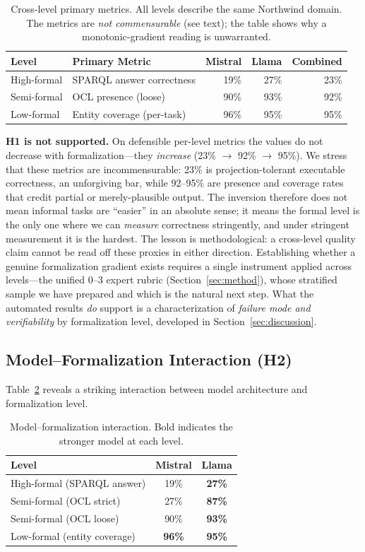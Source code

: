 \documentclass[runningheads]{llncs}
\begin{document}
\begin{table}[h]
\centering
\caption{Cross-level primary metrics. All levels describe the same Northwind domain. The metrics are \emph{not commensurable} (see text); the table shows why a monotonic-gradient reading is unwarranted.}
\label{tab:summary}
\begin{tabular}{llrrr}
\toprule
Level & Primary Metric & Mistral & Llama & Combined \\
\midrule
High-formal & SPARQL answer correctness & 19\% & 27\% & 23\% \\
Semi-formal & OCL presence (loose) & 90\% & 93\% & 92\% \\
Low-formal & Entity coverage (per-task) & 96\% & 95\% & 95\% \\
\bottomrule
\end{tabular}
\end{table}

\textbf{H1 is not supported.} On defensible per-level metrics the values do not decrease with formalization---they \emph{increase} (23\% $\to$ 92\% $\to$ 95\%). We stress that these metrics are incommensurable: 23\% is projection-tolerant executable correctness, an unforgiving bar, while 92--95\% are presence and coverage rates that credit partial or merely-plausible output. The inversion therefore does not mean informal tasks are ``easier'' in an absolute sense; it means the formal level is the only one where we can \emph{measure} correctness stringently, and under stringent measurement it is the hardest. The lesson is methodological: a cross-level quality claim cannot be read off these proxies in either direction. Establishing whether a genuine formalization gradient exists requires a single instrument applied across levels---the unified 0--3 expert rubric (Section~\ref{sec:method}), whose stratified sample we have prepared and which is the natural next step. What the automated results \emph{do} support is a characterization of \emph{failure mode and verifiability} by formalization level, developed in Section~\ref{sec:discussion}.

\subsection{Model--Formalization Interaction (H2)}

Table~\ref{tab:interaction} reveals a striking interaction between model architecture and formalization level.

\begin{table}[h]
\centering
\caption{Model--formalization interaction. Bold indicates the stronger model at each level.}
\label{tab:interaction}
\begin{tabular}{lcc}
\toprule
Level & Mistral & Llama \\
\midrule
High-formal (SPARQL answer) & 19\% & \textbf{27\%} \\
Semi-formal (OCL strict) & 27\% & \textbf{87\%} \\
Semi-formal (OCL loose) & 90\% & \textbf{93\%} \\
Low-formal (entity coverage) & \textbf{96\%} & \textbf{95\%} \\
\bottomrule
\end{tabular}
\end{table}
\end{document}
